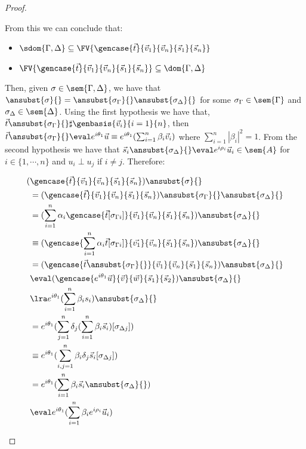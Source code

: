 \begin{proof}
\begin{description}
    From this we can conclude that:
    
    \begin{itemize}
        \item $\sdom{\Gamma,\Delta}\subseteq \FV{\gencase{\vec{t}}{\vec{v}_{1}}{\vec{v}_{n}}{\vec{s}_{1}}{\vec{s}_{n}}}$
        \item $\FV{\gencase{\vec{t}}{\vec{v}_{1}}{\vec{v}_{n}}{\vec{s}_{1}}{\vec{s}_{n}}}\subseteq \dom{\Gamma,\Delta}$
    \end{itemize}
    
    Then, given $\sigma\in\sem{\Gamma,\Delta}$, we have that $\ansubst{\sigma}{}=\ansubst{\sigma_\Gamma}{}\ansubst{\sigma_\Delta}{}$ for some $\sigma_\Gamma\in\sem{\Gamma}$ and $\sigma_\Delta\in\sem{\Delta}$. Using the first hypothesis we have that, $\vec{t}\ansubst{\sigma_\Gamma}{}\real\sharp\genbasis{\vec{v}_{i}}{i=1}{n}$, then $\vec{t}\ansubst{\sigma_\Gamma}{}\eval e^{i\theta_1} \vec{u}\equiv e^{i\theta_1} (\sum_{i=1}^{n}\beta_i \vec{v}_{i})$ where $\sum_{i=1}^{n}|\beta_i|^2=1$. From the second hypothesis we have that $\vec{s}_{i}\ansubst{\sigma_\Delta}{}\eval e^{i\rho_i} \vec{u}_{i}\in\sem{A}$ for $i\in\{1,\dotsb ,n\}$ and $u_i\perp u_j$ if $i\neq j$. Therefore:

    \begin{align*}
        (&\gencase{\vec{t}}{\vec{v}_{1}}{\vec{v}_{n}}{\vec{s}_{1}}{\vec{s}_{n}})\ansubst{\sigma}{}\\ 
        &= (\gencase{\vec{t}}{\vec{v}_{1}}{\vec{v}_{n}}{\vec{s}_{1}}{\vec{s}_{n}})\ansubst{\sigma_\Gamma}{}\ansubst{\sigma_\Delta}{}\\
        &=(\sum_{i=1}^{n}\alpha_i \gencase{\vec{t}[\sigma_{\Gamma i}]}{\vec{v}_{1}}{\vec{v}_{n}}{\vec{s}_{1}}{\vec{s}_{n}})\ansubst{\sigma_\Delta}{} \\
        &\equiv (\gencase{\sum_{i=1}^{n} \alpha_i \vec{t}[\sigma_{\Gamma i}]}{\vec {v_1}}{\vec{v}_{n}}{\vec{s}_{1}}{\vec{s}_{n}})\ansubst{\sigma_\Delta}{}\\
        &=(\gencase{\vec{t}\ansubst{\sigma_\Gamma}{}}{\vec{v}_{1}}{\vec{v}_{n}}{\vec{s}_{1}}{\vec{s}_{n}})\ansubst{\sigma_\Delta}{}\\
        &\eval(\gencase{e^{i\theta_1} \vec{u}}{\vec{v}}{\vec{w}}{\vec{s}_{1}}{\vec{s}_{2}})\ansubst{\sigma_\Delta}{}\\
        &\lra e^{i\theta_1} (\sum_{i=1}^{n}\beta_i s_i)\ansubst{\sigma_\Delta}{}\\
        &= e^{i\theta_1} (\sum_{j=1}^{n}\delta_j (\sum_{i=1}^{n}\beta_i \vec{s}_{i})[\sigma_{\Delta j}])\\
        &\equiv e^{i\theta_1} (\sum_{i,j=1}^{n}\beta_i\delta_j\vec{s}_{i}[\sigma_{\Delta j}])\\
        &= e^{i\theta_1} (\sum_{i=1}^{n}\beta_i \vec{s}_{i}\ansubst{\sigma_\Delta}{})\\
        &\eval e^{i\theta_1} (\sum_{i=1}^{n}\beta_i e^{i\rho_i} \vec{u}_{i})
    \end{align*}
    

\end{description}
\end{proof}
